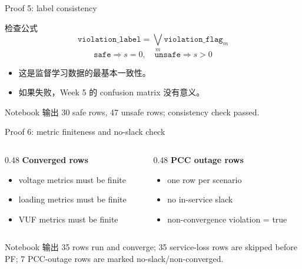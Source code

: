\documentclass[aspectratio=169,11pt]{beamer}
\begin{document}
\begin{frame}{Proof 5: label consistency}
\begin{block}{检查公式}
\[
\texttt{violation\_label}=\bigvee_m \texttt{violation\_flag}_m
\]
\[
\texttt{safe}\Rightarrow s=0,\quad \texttt{unsafe}\Rightarrow s>0
\]
\end{block}
\begin{itemize}
  \item 这是监督学习数据的最基本一致性。
  \item 如果失败，Week 5 的 confusion matrix 没有意义。
\end{itemize}
\begin{exampleblock}{Notebook 输出}
30 safe rows, 47 unsafe rows; consistency check passed.
\end{exampleblock}
\end{frame}

\begin{frame}{Proof 6: metric finiteness and no-slack check}
\begin{columns}
\begin{column}{0.48\textwidth}
\textbf{Converged rows}\
\begin{itemize}
  \item voltage metrics must be finite
  \item loading metrics must be finite
  \item VUF metrics must be finite
\end{itemize}
\end{column}
\begin{column}{0.48\textwidth}
\textbf{PCC outage rows}\
\begin{itemize}
  \item one row per scenario
  \item no in-service slack
  \item non-convergence violation = true
\end{itemize}
\end{column}
\end{columns}
\begin{exampleblock}{Notebook 输出}
35 rows run and converge; 35 service-loss rows are skipped before PF; 7 PCC-outage rows are marked no-slack/non-converged.
\end{exampleblock}
\end{frame}
\end{document}
